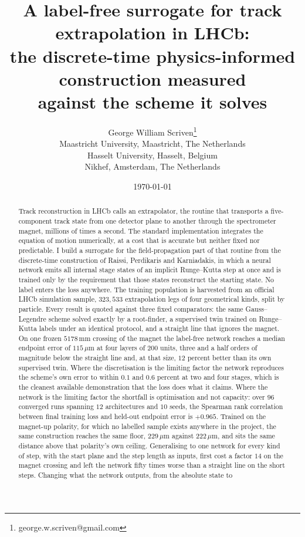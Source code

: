 \documentclass[11pt,a4paper]{article}
\title{A label-free surrogate for track extrapolation in LHCb:\\
the discrete-time physics-informed construction measured\\
against the scheme it solves}
\author{George William Scriven\thanks{george.w.scriven@gmail.com}\\[2pt]
\normalsize Maastricht University, Maastricht, The Netherlands\\
\normalsize Hasselt University, Hasselt, Belgium\\
\normalsize Nikhef, Amsterdam, The Netherlands}
\date{\today}
\newcommand{\um}{\ensuremath{\,\mu\mathrm{m}}}
\newcommand{\mm}{\ensuremath{\,\mathrm{mm}}}
\begin{document}
\maketitle

\begin{abstract}
Track reconstruction in LHCb calls an extrapolator, the routine that transports
a five-component track state from one detector plane to another through the
spectrometer magnet, millions of times a second. The standard implementation
integrates the equation of motion numerically, at a cost that is accurate but
neither fixed nor predictable. I build a surrogate for the field-propagation
part of that routine from the discrete-time construction of Raissi, Perdikaris
and Karniadakis, in which a neural network emits all internal stage states of an
implicit Runge--Kutta step at once and is trained only by the requirement that
those states reconstruct the starting state. No label enters the loss anywhere.
The training population is harvested from an official LHCb simulation sample,
$323{,}533$ extrapolation legs of four geometrical kinds, split by particle.
Every result is quoted against three fixed comparators: the same
Gauss--Legendre scheme solved exactly by a root-finder, a supervised twin
trained on Runge--Kutta labels under an identical protocol, and a straight line
that ignores the magnet. On one frozen $5178\mm$ crossing of the magnet the
label-free network reaches a median endpoint error of $115\um$ at four layers of
$200$ units, three and a half orders of magnitude below the straight line and,
at that size, $12$ percent better than its own supervised twin. Where the
discretisation is the limiting factor the network reproduces the scheme's own
error to within $0.1$ and $0.6$ percent at two and four stages, which is the
cleanest available demonstration that the loss does what it claims. Where the
network is the limiting factor the shortfall is optimisation and not capacity:
over $96$ converged runs spanning $12$ architectures and $10$ seeds, the
Spearman rank correlation between final training loss and held-out endpoint
error is $+0.965$. Trained on the magnet-up polarity, for which no labelled
sample exists anywhere in the project, the same construction reaches
the same floor, $229\um$ against $222\um$, and sits the same distance above that
polarity's own ceiling. Generalising to one network for every kind of step, with
the start plane and the step length as inputs, first cost a factor $14$ on the
magnet crossing and left the network fifty times worse than a straight line on
the short steps. Changing what the network outputs, from the absolute state to

\end{abstract}
\end{document}
